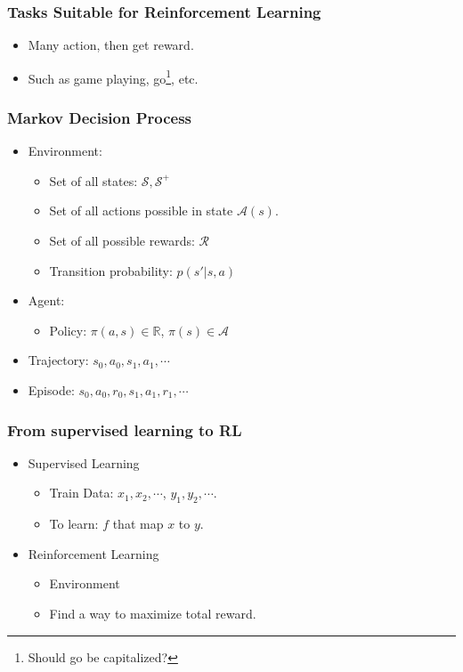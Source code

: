 \begin{frame}
  \frametitle{Tasks Suitable for Reinforcement Learning}
  \begin{itemize}
  \item Many action, then get reward.
  \item Such as game playing, go\footnote{Should go be capitalized?}, etc.
  \end{itemize}
\end{frame}

\begin{frame}
  \frametitle{Markov Decision Process}
  \begin{itemize}
    \item Environment:
      \begin{itemize}
      \item Set of all states: $\mathcal{S}, \mathcal{S}^+$
      \item Set of all actions possible in state $\mathcal{A}(s)$.
      \item Set of all possible rewards: $\mathcal{R}$
      \item Transition probability: $p(s'|s, a)$
      \end{itemize}
    \item Agent:
      \begin{itemize}
      \item Policy: $\pi(a, s) \in \mathbb{R}$, $\pi(s) \in \mathcal{A}$
      \end{itemize}
    \item Trajectory: $s_0, a_0, s_1, a_1, \cdots$
    \item Episode: $s_0, a_0, r_0, s_1, a_1, r_1, \cdots$
  \end{itemize}
\end{frame}

\begin{frame}
  \frametitle{From supervised learning to RL}
  \begin{itemize}
  \item Supervised Learning
    \begin{itemize}
    \item Train Data: $x_1, x_2, \cdots$, $y_1, y_2, \cdots$.
    \item To learn: $f$ that map $x$ to $y$.
    \end{itemize}
  \item Reinforcement Learning
    \begin{itemize}
    \item Environment
    \item Find a way to maximize total reward.
    \end{itemize}
  \end{itemize}
\end{frame}

